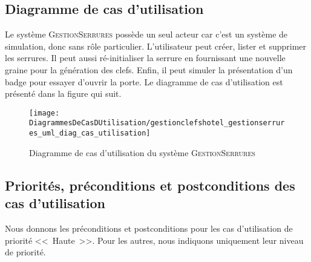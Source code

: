 \documentclass[11pt,article]{article}
\newcommand{\haute}{Haute}
\newcommand{\gestionserrures}{\textsc{GestionSerrures}\xspace}
\begin{document}
\subsection{Diagramme de cas d'utilisation}
\label{SS_simserrures_specification_diag_cas_utilisation}

Le système \gestionserrures possède un seul acteur car c'est un
système de simulation, donc sans rôle particulier. L'utilisateur peut
créer, lister et supprimer les serrures. Il peut aussi ré-initialiser
la serrure en fournissant une nouvelle graine pour la génération des
clefs. Enfin, il peut simuler la présentation d'un badge pour essayer
d'ouvrir la porte. Le diagramme de cas d'utilisation est présenté dans
la figure qui suit.

\begin{figure}[!ht]
\begin{center}
\texttt{[image: DiagrammesDeCasDUtilisation/gestionclefshotel\_gestionserrures\_uml\_diag\_cas\_utilisation]}
\caption{Diagramme de cas d'utilisation du système \gestionserrures}
\end{center}
\label{F_usecase_umlet_simserrures}
\end{figure}

\newpage

\subsection{Priorités, préconditions et postconditions des cas d'utilisation}
\label{SS_simserrures_specification_pre_post_conditions}

Nous donnons les préconditions et postconditions pour les cas
d'utilisation de priorité <<~\haute~>>. Pour les autres, nous
indiquons uniquement leur niveau de priorité.
\end{document}

